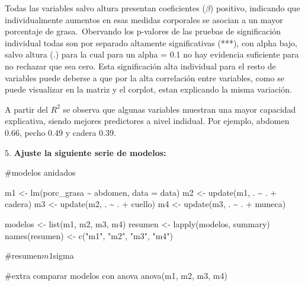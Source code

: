 \documentclass[
  letterpaper,
  DIV=11,
  numbers=noendperiod]{scrartcl}
\newenvironment{Shaded}{\begin{snugshade}}{\end{snugshade}}
\newcommand{\AttributeTok}[1]{\textcolor[rgb]{0.40,0.45,0.13}{#1}}
\newcommand{\CommentTok}[1]{\textcolor[rgb]{0.37,0.37,0.37}{#1}}
\newcommand{\FunctionTok}[1]{\textcolor[rgb]{0.28,0.35,0.67}{#1}}
\newcommand{\NormalTok}[1]{\textcolor[rgb]{0.00,0.23,0.31}{#1}}
\newcommand{\OtherTok}[1]{\textcolor[rgb]{0.00,0.23,0.31}{#1}}
\newcommand{\SpecialCharTok}[1]{\textcolor[rgb]{0.37,0.37,0.37}{#1}}
\newcommand{\StringTok}[1]{\textcolor[rgb]{0.13,0.47,0.30}{#1}}
\begin{document}
Todas las variables salvo altura presentan coeficientes (\(\beta\))
positivo, indicando que individualmente aumentos en esas medidas
corporales se asocian a un mayor porcentaje de grasa.~Obervando los
p-valores de las pruebas de significación individual todas son por
separado altamente significativas (***), con alpha bajo, salvo altura
(.) para la cual para un alpha = 0.1 no hay evidencia suficiente para no
rechazar que sea cero. Esta significación alta individual para el resto
de variables puede deberse a que por la alta correlación entre
variables, como se puede visualizar en la matriz y el corplot, estan
explicando la misma variación.

A partir del \(R^2\) se observa que algunas variables muestran una mayor
capacidad explicativa, siendo mejores predictores a nivel indidual. Por
ejemplo, abdomen 0.66, pecho 0.49 y cadera 0.39.

5. \textbf{Ajuste la siguiente serie de modelos:}

\begin{Shaded}
\begin{Highlighting}[]
\CommentTok{\#modelos anidados}

\NormalTok{m1 }\OtherTok{\textless{}{-}} \FunctionTok{lm}\NormalTok{(porc\_grasa }\SpecialCharTok{\textasciitilde{}}\NormalTok{ abdomen, }\AttributeTok{data =}\NormalTok{ data)}
\NormalTok{m2 }\OtherTok{\textless{}{-}} \FunctionTok{update}\NormalTok{(m1, . }\SpecialCharTok{\textasciitilde{}}\NormalTok{ . }\SpecialCharTok{+}\NormalTok{ cadera)}
\NormalTok{m3 }\OtherTok{\textless{}{-}} \FunctionTok{update}\NormalTok{(m2, . }\SpecialCharTok{\textasciitilde{}}\NormalTok{ . }\SpecialCharTok{+}\NormalTok{ cuello)}
\NormalTok{m4 }\OtherTok{\textless{}{-}} \FunctionTok{update}\NormalTok{(m3, . }\SpecialCharTok{\textasciitilde{}}\NormalTok{ . }\SpecialCharTok{+}\NormalTok{ muneca)}

\NormalTok{modelos }\OtherTok{\textless{}{-}} \FunctionTok{list}\NormalTok{(m1, m2, m3, m4)}
\NormalTok{resumen }\OtherTok{\textless{}{-}} \FunctionTok{lapply}\NormalTok{(modelos, summary)}
\FunctionTok{names}\NormalTok{(resumen) }\OtherTok{\textless{}{-}} \FunctionTok{c}\NormalTok{(}\StringTok{"m1"}\NormalTok{, }\StringTok{"m2"}\NormalTok{, }\StringTok{"m3"}\NormalTok{, }\StringTok{"m4"}\NormalTok{)}

\CommentTok{\#resumen$m1$sigma}
\end{Highlighting}
\end{Shaded}

\begin{Shaded}
\begin{Highlighting}[]
\CommentTok{\#extra comparar modelos con anova}
\FunctionTok{anova}\NormalTok{(m1, m2, m3, m4)}
\end{Highlighting}
\end{Shaded}
\end{document}
